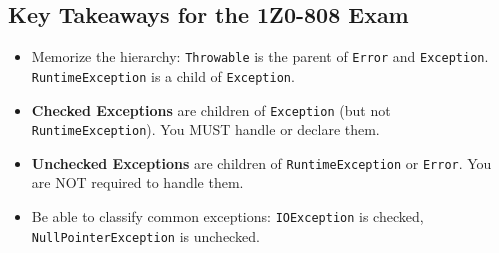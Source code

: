 \documentclass[12pt]{article}
\begin{document}
\begin{enumerate}[label=(\arabic*)]
\section*{Key Takeaways for the 1Z0-808 Exam}
\begin{itemize}
    \item Memorize the hierarchy: \texttt{Throwable} is the parent of \texttt{Error} and \texttt{Exception}. \texttt{RuntimeException} is a child of \texttt{Exception}.
    \item \textbf{Checked Exceptions} are children of \texttt{Exception} (but not \texttt{RuntimeException}). You MUST handle or declare them.
    \item \textbf{Unchecked Exceptions} are children of \texttt{RuntimeException} or \texttt{Error}. You are NOT required to handle them.
    \item Be able to classify common exceptions: \texttt{IOException} is checked, \texttt{NullPointerException} is unchecked.
\end{itemize}
\end{enumerate}
\end{document}
